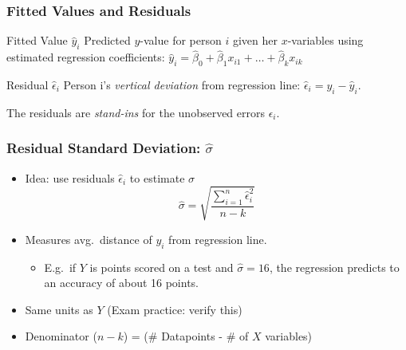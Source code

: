 \begin{frame}
\frametitle{Fitted Values and Residuals}

\begin{block}{Fitted Value $\widehat{y}_i$}
Predicted $y$-value for person $i$ given her $x$-variables using estimated regression coefficients: \alert{$\widehat{y}_i = \widehat{\beta}_0 + \widehat{\beta}_1 x_{i1} + \hdots + \widehat{\beta}_k x_{ik}$}
\end{block}


\begin{block}{Residual $\widehat{\epsilon}_i$}
  Person i's \emph{vertical deviation} from regression line: \alert{$\widehat{\epsilon}_i = y_i - \widehat{y}_i$}. 
\end{block}

\vspace{1em}
\alert{The residuals are \emph{stand-ins} for the unobserved errors $\epsilon_i$.}

\end{frame}
\begin{frame}
\frametitle{Residual Standard Deviation: $\widehat{\sigma}$}
	\begin{itemize}
    \item Idea: use residuals $\widehat{\epsilon}_i$ to estimate $\sigma$
	$$\widehat{\sigma}  = \sqrt{\frac{\sum_{i=1}^n \widehat{\epsilon}_i^2}{n -k}}$$ 
		\item Measures avg.\ distance of $y_i$ from regression line.
				\begin{itemize}
					\item E.g.\ if $Y$ is points scored on a test and $\widehat{\sigma}=16$, the regression predicts to an accuracy of about 16 points. 
				\end{itemize}
	\item Same units as $Y$ (Exam practice: verify this) 
	\item Denominator  ($n-k$) = (\# Datapoints - \# of $X$ variables) 
	\end{itemize}

\end{frame}





